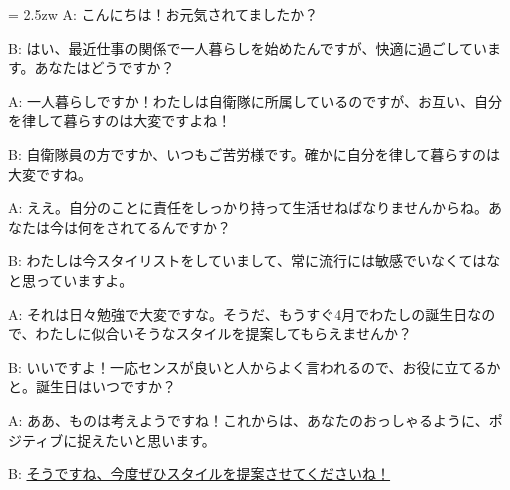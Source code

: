 \documentclass[11pt]{amsart}
\title{}
\author{}
\newenvironment{hangall}[1]{\hangindent = 2.5zw\everypar{\hangindent = 2.5zw}}{}
\begin{document}
\maketitle
\begin{hangall}{}%
A: こんにちは！お元気されてましたか？

B: はい、最近仕事の関係で一人暮らしを始めたんですが、快適に過ごしています。あなたはどうですか？

A: 一人暮らしですか！わたしは自衛隊に所属しているのですが、お互い、自分を律して暮らすのは大変ですよね！

B: 自衛隊員の方ですか、いつもご苦労様です。確かに自分を律して暮らすのは大変ですね。

A: ええ。自分のことに責任をしっかり持って生活せねばなりませんからね。あなたは今は何をされてるんですか？

B: わたしは今スタイリストをしていまして、常に流行には敏感でいなくてはなと思っていますよ。

A: それは日々勉強で大変ですな。そうだ、もうすぐ4月でわたしの誕生日なので、わたしに似合いそうなスタイルを提案してもらえませんか？

B: いいですよ！一応センスが良いと人からよく言われるので、お役に立てるかと。誕生日はいつですか？

A: ああ、ものは考えようですね！これからは、あなたのおっしゃるように、ポジティブに捉えたいと思います。

B: \ul{そうですね、今度ぜひスタイルを提案させてくださいね！}\end{hangall}
\end{document}
